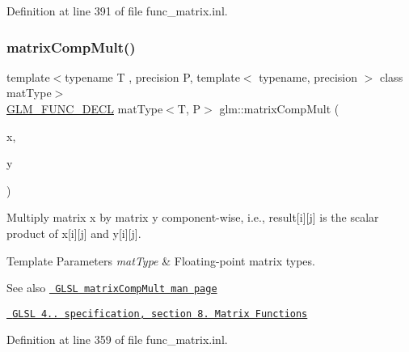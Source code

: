Definition at line 391 of file func\+\_\+matrix.\+inl.

\mbox{\label{group__core__func__matrix_ga4a54992e4741188ee624b21e3ba91814}} 
\subsubsection{\texorpdfstring{matrixCompMult()}{matrixCompMult()}}
{\footnotesize\ttfamily template$<$typename T , precision P, template$<$ typename, precision $>$ class mat\+Type$>$ \\
\mbox{\hyperlink{setup_8hpp_ab2d052de21a70539923e9bcbf6e83a51}{G\+L\+M\+\_\+\+F\+U\+N\+C\+\_\+\+D\+E\+CL}} mat\+Type$<$T, P$>$ glm\+::matrix\+Comp\+Mult (\begin{DoxyParamCaption}\item[{mat\+Type$<$ T, P $>$ const \&}]{x,  }\item[{mat\+Type$<$ T, P $>$ const \&}]{y }\end{DoxyParamCaption})}

Multiply matrix x by matrix y component-\/wise, i.\+e., result\mbox{[}i\mbox{]}\mbox{[}j\mbox{]} is the scalar product of x\mbox{[}i\mbox{]}\mbox{[}j\mbox{]} and y\mbox{[}i\mbox{]}\mbox{[}j\mbox{]}.


\begin{DoxyTemplParams}{Template Parameters}
{\em mat\+Type} & Floating-\/point matrix types.\\
\hline
\end{DoxyTemplParams}
\begin{DoxySeeAlso}{See also}
\href{http://www.opengl.org/sdk/docs/manglsl/xhtml/matrixCompMult.xml}{\texttt{ G\+L\+SL matrix\+Comp\+Mult man page}} 

\href{http://www.opengl.org/registry/doc/GLSLangSpec.4.20.8.pdf}{\texttt{ G\+L\+SL 4.. specification, section 8. Matrix Functions}} 
\end{DoxySeeAlso}


Definition at line 359 of file func\+\_\+matrix.\+inl.

\mbox{\label{group__core__func__matrix_gae9f513dc8e4f3ceb993669321b6d0f09}} 
